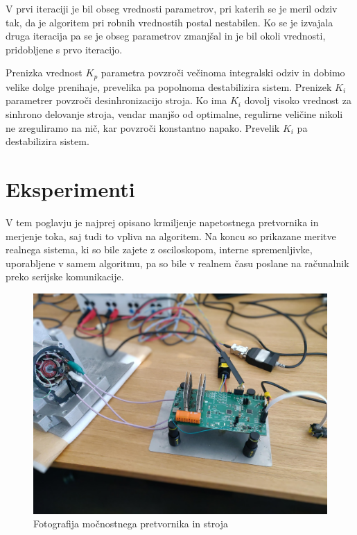 \documentclass[a4paper,twoside,openright,12pt,slovene]{book}
\begin{document}
V prvi iteraciji je bil obseg vrednosti parametrov, pri katerih se je meril odziv tak, da je algoritem pri robnih vrednostih postal nestabilen. Ko se je izvajala druga iteracija pa se je obseg
parametrov zmanjšal in je bil okoli vrednosti, pridobljene s prvo iteracijo.

Prenizka vrednost $K_p$ parametra povzroči večinoma integralski odziv in dobimo velike dolge prenihaje, prevelika pa popolnoma destabilizira sistem. Prenizek $K_i$ parametrer povzroči desinhronizacijo
stroja. Ko ima $K_i$ dovolj visoko vrednost za sinhrono delovanje stroja, vendar manjšo od optimalne, regulirne veličine nikoli ne zreguliramo na nič, kar povzroči konstantno napako.  Prevelik $K_i$
pa destabilizira sistem.

\chapter{Eksperimenti}  \label{eksperimenti}

V tem poglavju je najprej opisano krmiljenje napetostnega pretvornika in merjenje toka, saj tudi to vpliva na algoritem. Na koncu so prikazane meritve realnega sistema, ki so bile zajete z
osciloskopom, interne spremenljivke, uporabljene v samem algoritmu, pa so bile v realnem času poslane na računalnik preko serijske komunikacije.

\begin{figure}[!htbp]
    \centering
    \includegraphics[width=0.75\columnwidth]{Slike/EksperimentiSlika.jpg}
    \caption{\label{experimentiSlika} Fotografija močnostnega pretvornika in stroja}
\end{figure}
\end{document}
